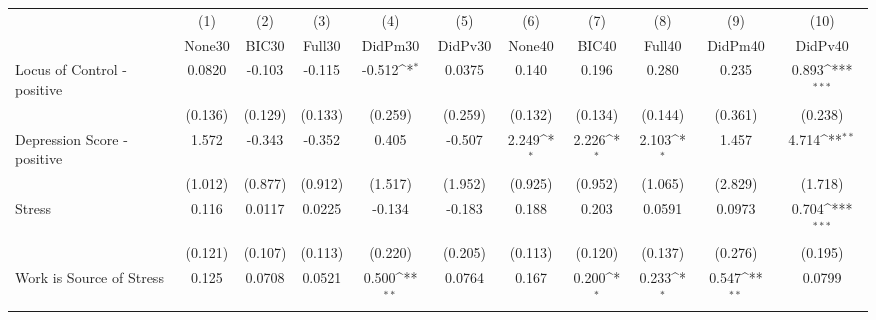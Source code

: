 {
\def\sym#1{\ifmmode^{#1}\else\(^{#1}\)\fi}
\begin{tabular}{l*{10}{c}}
\toprule
            &\multicolumn{1}{c}{(1)}&\multicolumn{1}{c}{(2)}&\multicolumn{1}{c}{(3)}&\multicolumn{1}{c}{(4)}&\multicolumn{1}{c}{(5)}&\multicolumn{1}{c}{(6)}&\multicolumn{1}{c}{(7)}&\multicolumn{1}{c}{(8)}&\multicolumn{1}{c}{(9)}&\multicolumn{1}{c}{(10)}\\
            &\multicolumn{1}{c}{None30}&\multicolumn{1}{c}{BIC30}&\multicolumn{1}{c}{Full30}&\multicolumn{1}{c}{DidPm30}&\multicolumn{1}{c}{DidPv30}&\multicolumn{1}{c}{None40}&\multicolumn{1}{c}{BIC40}&\multicolumn{1}{c}{Full40}&\multicolumn{1}{c}{DidPm40}&\multicolumn{1}{c}{DidPv40}\\
\midrule
Locus of Control - positive&      0.0820         &      -0.103         &      -0.115         &      -0.512\sym{*}  &      0.0375         &       0.140         &       0.196         &       0.280         &       0.235         &       0.893\sym{***}\\
            &     (0.136)         &     (0.129)         &     (0.133)         &     (0.259)         &     (0.259)         &     (0.132)         &     (0.134)         &     (0.144)         &     (0.361)         &     (0.238)         \\
\addlinespace
Depression Score - positive&       1.572         &      -0.343         &      -0.352         &       0.405         &      -0.507         &       2.249\sym{*}  &       2.226\sym{*}  &       2.103\sym{*}  &       1.457         &       4.714\sym{**} \\
            &     (1.012)         &     (0.877)         &     (0.912)         &     (1.517)         &     (1.952)         &     (0.925)         &     (0.952)         &     (1.065)         &     (2.829)         &     (1.718)         \\
\addlinespace
Stress      &       0.116         &      0.0117         &      0.0225         &      -0.134         &      -0.183         &       0.188         &       0.203         &      0.0591         &      0.0973         &       0.704\sym{***}\\
            &     (0.121)         &     (0.107)         &     (0.113)         &     (0.220)         &     (0.205)         &     (0.113)         &     (0.120)         &     (0.137)         &     (0.276)         &     (0.195)         \\
\addlinespace
Work is Source of Stress&       0.125         &      0.0708         &      0.0521         &       0.500\sym{**} &      0.0764         &       0.167         &       0.200\sym{*}  &       0.233\sym{*}  &       0.547\sym{**} &      0.0799         \\

\end{tabular}}
